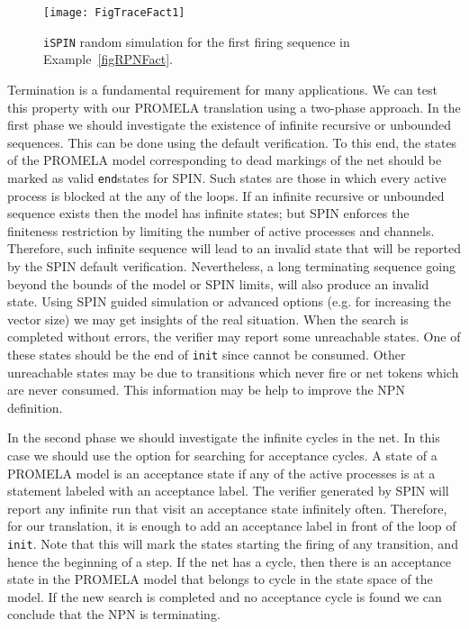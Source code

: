 \documentclass{llncs}
\begin{document}
\begin{figure}
\begin{center}
\texttt{[image: FigTraceFact1]}
\end{center}
\vspace{-10pt}
\caption{\texttt{iSPIN} random simulation for the first firing sequence in Example~\ref{figRPNFact}.}
\label{figTraceFact}
\end{figure}

Termination is a fundamental requirement for many applications. We can test this property with our PROMELA translation using a two-phase approach. In the first phase we should investigate the existence of infinite recursive or unbounded sequences. This can be done using the default verification. To this end, the states of the PROMELA model corresponding to dead markings of the net should be marked as valid \small\texttt{end}\nfont states for SPIN. Such states are those in which every active process is blocked at the any of the loops. If an infinite recursive or unbounded sequence exists then the model has infinite states; but SPIN enforces the finiteness restriction by limiting the number of active processes and channels. Therefore, such infinite sequence will lead to an invalid state that will be reported by the SPIN default verification. Nevertheless, a long terminating sequence going beyond the bounds of the model or SPIN limits, will also produce an invalid state. Using SPIN guided simulation or advanced options (e.g. for increasing the vector size) we may get insights of the real situation. When the search is completed without errors, the verifier may report some unreachable states. One of these states should be the end of \texttt{init} since  cannot be consumed. Other unreachable states may be due to transitions which never fire or net tokens which are never consumed. This information may be help to improve the NPN definition.

In the second phase we should investigate the infinite cycles in the net. In this case we should use the option for searching for acceptance cycles. A state of a PROMELA model is an acceptance state if any of the active processes is at a statement labeled with an acceptance label. The verifier generated by SPIN will report any infinite run that visit an acceptance state infinitely often. Therefore, for our translation, it is enough to add an acceptance label in front of the loop of \small\texttt{init}\nfont. Note that this will mark the states starting the firing of any transition, and hence the beginning of a step. If the net has a cycle, then there is an acceptance state in the PROMELA model that belongs to cycle in the state space of the model. If the new search is completed and no acceptance cycle is found we can conclude that the NPN is terminating.
\end{document}
